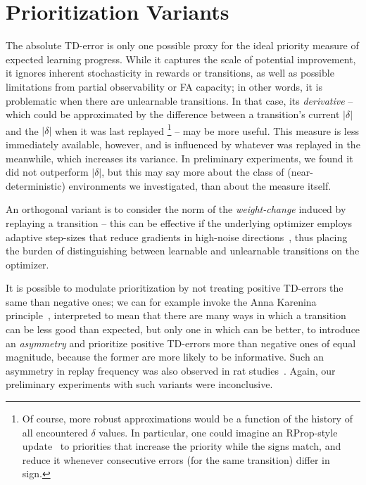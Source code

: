 \documentclass[a4paper]{article}
\begin{document}




\newpage

\appendix


\section{Prioritization Variants}
\label{sec-alternative-td}

The absolute TD-error is only one possible proxy for the ideal priority measure of expected learning progress.
While it captures the scale of potential improvement, it ignores inherent stochasticity in rewards or transitions, 
as well as possible limitations from partial observability or FA capacity; in other words, it is problematic
when there are unlearnable transitions. In that case, its \emph{derivative} -- which could be approximated by the difference between a transition's current $|\delta|$ and the $|\delta|$ when it was last replayed%
\footnote{Of course, more robust approximations would be a function of the history of all encountered $\delta$ values. 
In particular, one could imagine an RProp-style update~\citep{rprop} to priorities that increase the priority while 
the signs match, and reduce it whenever consecutive errors (for the same transition) differ in sign.}
-- may be more useful. 
This measure is less immediately available, however, and is influenced by whatever was replayed in the meanwhile, which increases its variance. 
In preliminary experiments, we found it  did not outperform $|\delta|$, but this may 
say more about the class of (near-deterministic) environments we investigated, than about the measure itself.

An orthogonal variant is to consider the norm of the \emph{weight-change} induced by replaying a transition -- this can be effective if
the underlying optimizer employs adaptive step-sizes that reduce gradients in high-noise directions~\citep{pesky,adam}, 
thus placing the burden of distinguishing between learnable and unlearnable transitions on the optimizer.


It is possible to modulate prioritization by not treating positive TD-errors the same than negative ones; we can for example invoke the
Anna Karenina principle~\citep{jdiamond-zebras}, interpreted to mean that there are many ways in which 
a transition can be less good than expected, but only one in which can be better, to introduce an \emph{asymmetry} and prioritize
positive TD-errors more than negative ones of equal magnitude, because the former are more likely to be informative.
Such an asymmetry in replay frequency was also observed in rat studies~\citep{dharsh4}.
Again, our preliminary experiments with such variants were inconclusive.
\end{document}
